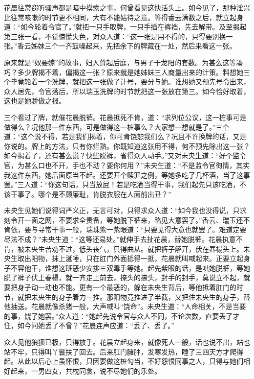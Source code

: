\documentclass[a4paper,12pt,UTF8,twoside]{ctexbook}
\begin{document}
花晨往常窃听骚声都是暗中摸索之事，何曾看见这快活头上。如今见了，那种淫兴比往常咳嗽的时节更不相同，大有不能姑待之意。等得香云满数之后，就立起身道：“如今轮着令官了。”就把一只手取牌，一只手插在裤裆，先去解带。及至揭起第三张一看，不觉惊慌失色，对众人道：“这一张是用不得的，只得要别换一张。”香云姊妹三个一齐鼓噪起来，先把余下的牌藏在一处，然后来看这一张。

原来就是“奴要嫁”的故事，妇人耸起后庭，与男子干龙阳的套数。为甚么这等凑巧？多少牌揭不着，偏揭这一张？原来就是她姊妹三人商量出来的计策。料想她三个毕竟轮着一个洗牌，就把这一张做了计号，要分与她。谁想她又预先号令出来，众人居先，令官落后，所以瑞玉洗牌的时节就把这一张放在第三。如今恰好取着，这也是她骄傲之报。

三个看过了牌，就催花晨脱裤。花晨抵死不肯，道：“求列位公议，这一桩事可是做得么？况他那一件东西，可是做得这一桩事么？大家想一想就是了。”三个道：“这个说不得，若是我们揭着，你可肯饶恕我们么？况且不许换牌的话，又是你说的。牌上的方法，只有你烂熟。你既知道这张用不得，何不预先除出这一张？如今揭着了，还有甚么说？快些脱裤，省得众人动手。”又对未央生道：“好个监令官，为甚么口也不开，手也不动？要你何用？”未央生道：“不是监令官徇情，其实我这件东西，她后面原当不起。还要开个赎罪之例，等她多吃了几杯酒，当了这事罢。”三人道：“你这句话，只当放屁！若是吃酒当得干事，我们起先只该吃酒，不该干事了。哪个是不顾廉耻，肯脱衣服在人面前出丑？”

未央生见她们说得词严义正，无言可对，只得求众人道：“如今我也没得说，只求刻令开一面之网，不要求全责备，等她脱下裤来，略见大意罢了。”香云、瑞玉还不肯依，要与寻常干事一般，瑞珠紫一紫眼道：“只要见得大意也就罢了。难道定要尽法不成？”未央生道：“这等还易处。”就伸手去扯花晨，替她脱裤。花晨执意不肯，被未央生苦劝不过，低头丧气，只得曲从。就把裤子解开，伏在春榻头上。未央生取出阳物，抹上涎唾，只在肛门外面抵得一抵，花晨就叫喊起来。正要立起身子不容他干，谁想这班恶少安排三双毒手等她。起先紫眼的话，是哄她脱裤，等她脱了裤子伏上春榻，就一齐走上前去，捺头的捺头，封手的封手，莫说立不起，就要把身子动一动也不能。更有一个最恶的，躲在未央生背后，等他抵着肛门的时节，就把未央生的身子着力一推。那阳物竟推进了半截，又把住未央生的身子，替他抽送。花晨就像杀猪一般，大声喊叫“饶命”。未央生道：“人命相关，不是当要的事，饶了她罢。”众人道：“她起先说令官与众人不同，不论次数，直要丢了才住，如今问她丢了不曾？”花晨连声应道：“丢了、丢了。”

众人见他狼狈已极，只得放手。花晨立起身来，就像死人一般，话也说不出，站也站不牢，只得叫丫鬟扶了回去。后来肛门臃肿，发寒发热，睡了三四天方才爬得起。从此以后心上虽怀恨，只因要做这桩勾当，不好怨恨同事之人，只得与她们相好起来，一男四女，共枕同衾，说不尽她们的乐处。
\end{document}

